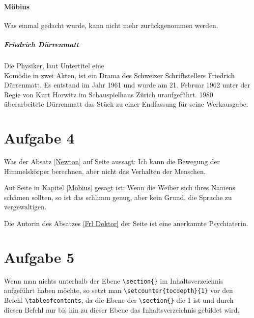 \documentclass[a4 paper]{article}
\begin{document}
\paragraph{Möbius}

    Was einmal gedacht wurde, kann nicht mehr zurückgenommen werden. 
    
\subparagraph{Friedrich Dürrenmatt}

    Die Physiker, laut Untertitel eine \\
    Komödie in zwei Akten, ist ein Drama des Schweizer Schriftstellers Friedrich Dürrenmatt. Es entstand im Jahr 1961 und wurde am 21. Februar 1962 unter der Regie von Kurt Horwitz im Schauspielhaus Zürich uraufgeführt. 1980 überarbeitete Dürrenmatt das Stück zu einer Endfassung für seine Werkausgabe.
 
\section{Aufgabe 4}

    Was der Absatz \ref{Newton} auf Seite \pageref{Newton} aussagt: Ich kann die Bewegung der Himmelskörper berechnen, aber nicht das Verhalten der  Menschen.
    
    Auf Seite \pageref{Möbius} in Kapitel \ref{Möbius} gesagt ist: Wenn die Weiber sich ihres Namens schämen sollten, so ist das schlimm genug, aber kein Grund, die Sprache zu vergewaltigen.
    
    Die Autorin des Absatzes \ref{Frl Doktor} der Seite \pageref{Frl Doktor} ist eine anerkannte Psychiaterin.

\section{Aufgabe 5}
  
    Wenn man nichts unterhalb der Ebene \verb+\section{}+ im Inhaltsverzeichnis aufgeführt haben möchte, so setzt man \verb+\setcounter{tocdepth}{1}+ vor den Befehl \verb+\tableofcontents+, da die Ebene der \verb+\section{}+ die 1 ist und durch diesen Befehl nur bis hin zu dieser Ebene das Inhaltsverzeichnis gebildet wird.
\end{document}
